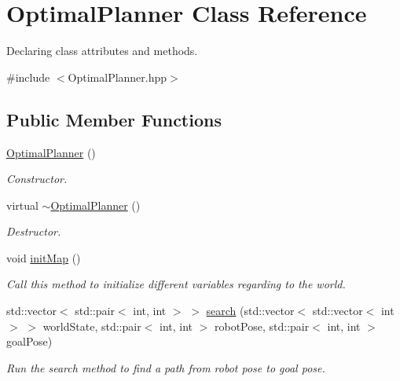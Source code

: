 \hypertarget{classOptimalPlanner}{}\section{Optimal\+Planner Class Reference}
\label{classOptimalPlanner}


Declaring class attributes and methods.  




{\ttfamily \#include $<$Optimal\+Planner.\+hpp$>$}

\subsection*{Public Member Functions}
\begin{DoxyCompactItemize}
\item 
\mbox{\label{classOptimalPlanner_a4e69f26a93d272239270348bf770a86c}} 
\mbox{\hyperlink{classOptimalPlanner_a4e69f26a93d272239270348bf770a86c}{Optimal\+Planner}} ()
\begin{DoxyCompactList}\small\item\em Constructor. \end{DoxyCompactList}\item 
\mbox{\label{classOptimalPlanner_a71703e8fe799a0a2cc94fdad5b2bf177}} 
virtual \mbox{\hyperlink{classOptimalPlanner_a71703e8fe799a0a2cc94fdad5b2bf177}{$\sim$\+Optimal\+Planner}} ()
\begin{DoxyCompactList}\small\item\em Destructor. \end{DoxyCompactList}\item 
void \mbox{\hyperlink{classOptimalPlanner_ab32e5f5dc1b4b599df70cc058701f2e8}{init\+Map}} ()
\begin{DoxyCompactList}\small\item\em Call this method to initialize different variables regarding to the world. \end{DoxyCompactList}\item 
std\+::vector$<$ std\+::pair$<$ int, int $>$ $>$ \mbox{\hyperlink{classOptimalPlanner_ad5eb38c0130e5cc6c410799c47598e09}{search}} (std\+::vector$<$ std\+::vector$<$ int $>$ $>$ world\+State, std\+::pair$<$ int, int $>$ robot\+Pose, std\+::pair$<$ int, int $>$ goal\+Pose)
\begin{DoxyCompactList}\small\item\em Run the search method to find a path from robot pose to goal pose. \end{DoxyCompactList}\end{DoxyCompactItemize}
